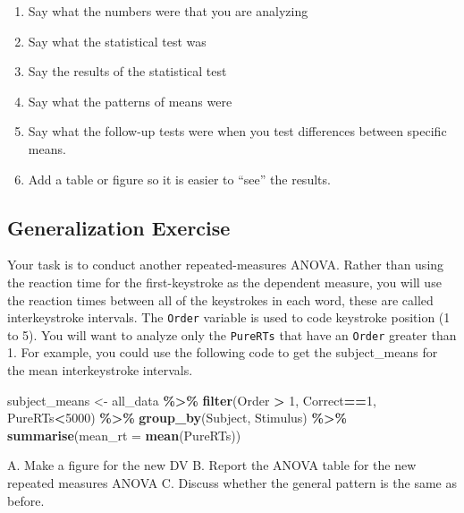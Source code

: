 \documentclass[
]{book}
\newenvironment{Shaded}{\begin{snugshade}}{\end{snugshade}}
\newcommand{\AttributeTok}[1]{\textcolor[rgb]{0.13,0.29,0.53}{#1}}
\newcommand{\DecValTok}[1]{\textcolor[rgb]{0.00,0.00,0.81}{#1}}
\newcommand{\FunctionTok}[1]{\textcolor[rgb]{0.13,0.29,0.53}{\textbf{#1}}}
\newcommand{\NormalTok}[1]{#1}
\newcommand{\OtherTok}[1]{\textcolor[rgb]{0.56,0.35,0.01}{#1}}
\newcommand{\SpecialCharTok}[1]{\textcolor[rgb]{0.81,0.36,0.00}{\textbf{#1}}}
\providecommand{\tightlist}{%
  \setlength{\itemsep}{0pt}\setlength{\parskip}{0pt}}
\begin{document}
\begin{enumerate}
\def\labelenumi{\arabic{enumi}.}
\tightlist
\item
  Say what the numbers were that you are analyzing
\item
  Say what the statistical test was
\item
  Say the results of the statistical test
\item
  Say what the patterns of means were
\item
  Say what the follow-up tests were when you test differences between specific means.
\item
  Add a table or figure so it is easier to ``see'' the results.
\end{enumerate}

\hypertarget{generalization-exercise-6}{%
\subsection{Generalization Exercise}\label{generalization-exercise-6}}

Your task is to conduct another repeated-measures ANOVA. Rather than using the reaction time for the first-keystroke as the dependent measure, you will use the reaction times between all of the keystrokes in each word, these are called interkeystroke intervals. The \texttt{Order} variable is used to code keystroke position (1 to 5). You will want to analyze only the \texttt{PureRTs} that have an \texttt{Order} greater than 1. For example, you could use the following code to get the subject\_means for the mean interkeystroke intervals.

\begin{Shaded}
\begin{Highlighting}[]
\NormalTok{subject\_means }\OtherTok{\textless{}{-}}\NormalTok{ all\_data }\SpecialCharTok{\%\textgreater{}\%}
                 \FunctionTok{filter}\NormalTok{(Order }\SpecialCharTok{\textgreater{}} \DecValTok{1}\NormalTok{, Correct}\SpecialCharTok{==}\DecValTok{1}\NormalTok{, PureRTs}\SpecialCharTok{\textless{}}\DecValTok{5000}\NormalTok{) }\SpecialCharTok{\%\textgreater{}\%}
                 \FunctionTok{group\_by}\NormalTok{(Subject, Stimulus) }\SpecialCharTok{\%\textgreater{}\%}
                 \FunctionTok{summarise}\NormalTok{(}\AttributeTok{mean\_rt =} \FunctionTok{mean}\NormalTok{(PureRTs))}
\end{Highlighting}
\end{Shaded}

A. Make a figure for the new DV
B. Report the ANOVA table for the new repeated measures ANOVA
C. Discuss whether the general pattern is the same as before.
\end{document}
